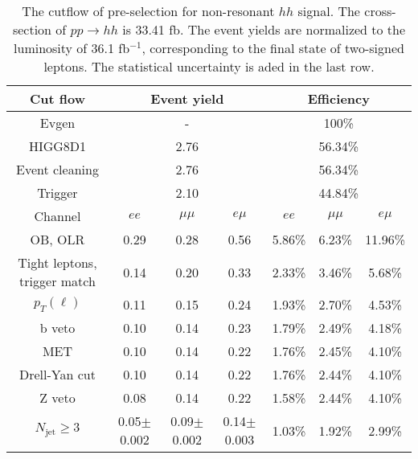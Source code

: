 \begin{table}
\centering\small
\begin{tabular}{c|ccc|ccc}
\hline
\hline
Cut flow &\multicolumn{3}{c|}{Event yield}&\multicolumn{3}{c}{Efficiency}      \\
\hline
Evgen&\multicolumn{3}{c|}{-}&\multicolumn{3}{c}{100\%}\\
HIGG8D1&\multicolumn{3}{c|}{2.76}&\multicolumn{3}{c}{56.34\%}\\
Event cleaning&\multicolumn{3}{c|}{2.76}&\multicolumn{3}{c}{56.34\%}\\
Trigger&\multicolumn{3}{c|}{2.10    }&\multicolumn{3}{c}{44.84\%}\\
Channel&$ee$&$\mu\mu$&$e\mu$&$ee$&$\mu\mu$&$e\mu$\\
\hline
OB, OLR    &0.29    &0.28    &0.56& 5.86\%    &6.23\%    &11.96\%\\
Tight leptons, trigger match    &0.14    &0.20    &0.33    &2.33\%    &3.46\%    &5.68\%\\
$p_T(\ell)$    &0.11    &0.15    &0.24    &1.93\%    &2.70\%    &4.53\%\\
b veto    &0.10    &0.14    &0.23    &1.79\%    &2.49\%    &4.18\%\\
MET    &0.10    &0.14    &0.22    &1.76\%    &2.45\%    &4.10\%\\
Drell-Yan cut    &0.10    &0.14    &0.22    &1.76\%    &2.44\%    &4.10\%\\
Z veto    &0.08    &0.14    &0.22    &1.58\%    &2.44\%    &4.10\%\\
$N_{\text{jet}}\geq3$    &0.05$\pm$0.002    &0.09$\pm$0.002    &0.14$\pm$0.003    &1.03\%    &1.92\%    &2.99\%\\
\hline
\hline
\end{tabular}
\caption{The cutflow of pre-selection for non-resonant $hh$ signal. The cross-section of $pp \rightarrow hh$ is 33.41 fb. The event yields are normalized to the luminosity of 36.1 fb$^{-1}$, corresponding to the final state of two-signed leptons. The statistical uncertainty is aded in the last row.}
\label{tab:cut_flow_preselection_nonres}
\end{table}
